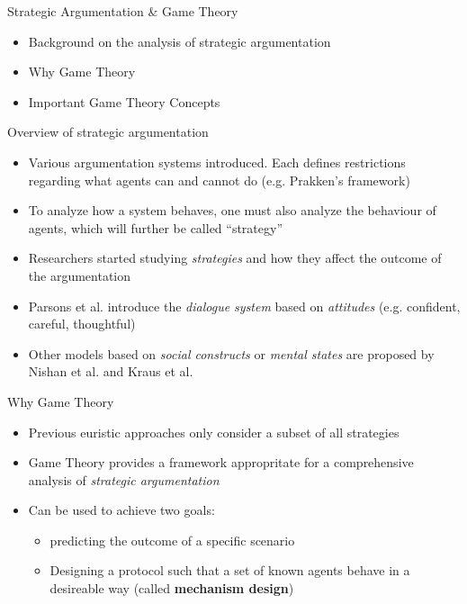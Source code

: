 \documentclass{beamer}
\begin{document}
\begin{frame}{Strategic Argumentation \& Game Theory}
\begin{itemize}
    \item Background on the analysis of strategic argumentation
    \item Why Game Theory
    \item Important Game Theory Concepts
\end{itemize}
\end{frame}

\begin{frame}{Overview of strategic argumentation}
\begin{itemize}
    \item Various argumentation systems introduced. Each defines restrictions regarding what agents can and cannot do (e.g. Prakken's framework) \pause
    \item To analyze how a system behaves, one must also analyze the behaviour of agents, which will further be called ``strategy'' \pause
    \item Researchers started studying \emph{strategies} and how they affect the outcome of the argumentation \pause
    \item Parsons et al. introduce the \emph{dialogue system} based on \emph{attitudes} (e.g. confident, careful, thoughtful) \pause
    \item Other models based on \emph{social constructs} or \emph{mental states} are proposed by Nishan et al. and Kraus et al. \pause
\end{itemize}
\end{frame}

\begin{frame}{Why Game Theory}
\begin{itemize}
    \item Previous euristic approaches only consider a subset of all strategies \pause
    \item Game Theory provides a framework appropritate for a comprehensive analysis of \emph{strategic argumentation}\pause
    \item Can be used to achieve two goals:\pause
        \begin{itemize}
            \item predicting the outcome of a specific scenario\pause
            \item Designing a protocol such that a set of known agents behave
                in a desireable way (called \textbf{mechanism design})\pause
        \end{itemize}
\end{itemize}
\end{frame}
\end{document}
